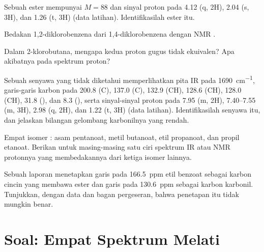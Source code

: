 \begin{exercise}[$\star\star$]\label{exo:b2:structure-determination:7}
Sebuah ester mempunyai $M = 88$ dan sinyal proton pada 4.12 (q, 2H), 2.04
(s, 3H), dan 1.26 (t, 3H) (data latihan). Identifikasilah ester itu.
\end{exercise}

\begin{exercise}[$\star\star$]\label{exo:b2:structure-determination:8}
Bedakan 1,2-diklorobenzena dari 1,4-diklorobenzena dengan NMR .
\end{exercise}

\begin{exercise}[$\star\star$]\label{exo:b2:structure-determination:9}
Dalam 2-klorobutana, mengapa kedua proton gugus  tidak ekuivalen?
Apa akibatnya pada spektrum proton?
\end{exercise}

\begin{exercise}[$\star\star\star$]\label{exo:b2:structure-determination:10}
Sebuah senyawa yang tidak diketahui  memperlihatkan pita IR pada
\qty{1690}{cm^{-1}}, garis-garis karbon pada 200.8 (C), 137.0 (C), 132.9
(CH), 128.6 (CH), 128.0 (CH), 31.8 (), dan 8.3 (), serta
sinyal-sinyal proton pada 7.95 (m, 2H), 7.40--7.55 (m, 3H), 2.98 (q, 2H),
dan 1.22 (t, 3H) (data latihan). Identifikasilah senyawa itu, dan jelaskan
bilangan gelombang karbonilnya yang rendah.
\end{exercise}

\begin{exercise}[$\star\star\star$]\label{exo:b2:structure-determination:11}
Empat isomer : asam pentanoat, metil butanoat, etil propanoat,
dan propil etanoat. Berikan untuk masing-masing satu ciri spektrum IR atau
NMR protonnya yang membedakannya dari ketiga isomer lainnya.
\end{exercise}

\begin{exercise}[$\star\star\star$]\label{exo:b2:structure-determination:12}
Sebuah laporan menetapkan garis pada 166.5~ppm etil benzoat sebagai karbon
cincin yang membawa ester dan garis pada 130.6~ppm sebagai karbon karbonil.
Tunjukkan, dengan data  dan bagan pergeseran, bahwa penetapan itu
tidak mungkin benar.
\end{exercise}

\section{Soal: Empat Spektrum Melati}

